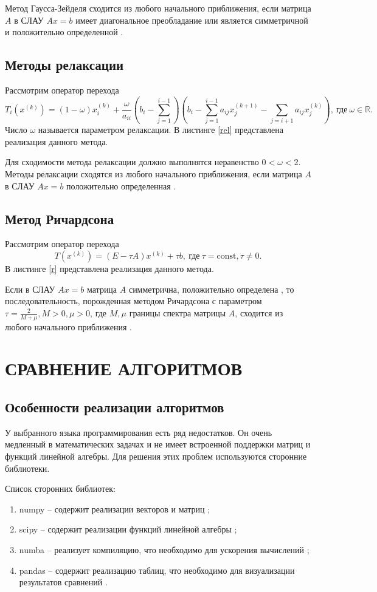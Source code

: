 \documentclass[14pt]{extarticle}
\begin{document}
     Метод Гаусса-Зейделя сходится из любого начального приближения, если матрица $A$ в СЛАУ
     $Ax= b$ имеет диагональное преобладание или является симметричной и положительно определенной \cite{book}.
      \subsection{Методы релаксации}
      Рассмотрим оператор перехода 
      \[
      T_{i}(x^{(k)}) = (1- \omega) x_{i}^{(k)} + \frac{\omega}{a_{ii}}
      (b_{i} - \sum_{j=1}^{i-1}) (b_{i} - \sum_{j=1}^{i-1} a_{ij} x_{j}^{(k+1)} -
      \sum_{j=i+1} a_{ij} x_{j}^{(k)}), ~
      \text{где}~ \omega \in \mathbb{R}
      .\] 
      Число $\omega$ называется параметром релаксации. В листинге \ref{rel} представлена реализация данного метода.
      
      Для сходимости метода релаксации должно выполнятся неравенство $0<\omega<2$.
      Методы релаксации сходятся из любого начального приближения, если матрица  $A$ в СЛАУ 
      $Ax=b$  положительно определенная \cite{book}. 
\subsection{Метод Ричардсона}
Рассмотрим оператор перехода
\[
    T(x^{(k)}) = (E - \tau A) x^{(k)} + \tau b, ~ \text{где} ~ \tau = \text{const}, \tau \neq 0
.\] 
В листинге \ref{r} представлена реализация данного метода.

Если в СЛАУ $Ax = b$ матрица  $A$ симметрична, положительно определена , то последовательность, порожденная методом Ричардсона с параметром
$\tau = \frac{2}{M + \mu}, M>0,\mu>0$, где $M,\mu$ границы спектра матрицы $A$, сходится из любого начального приближения \cite{book}.
\pagebreak
\section{СРАВНЕНИЕ АЛГОРИТМОВ}
\subsection{Особенности реализации алгоритмов}
У выбранного языка программирования есть ряд недостатков. Он очень медленный 
в математических задачах и не имеет встроенной поддержки матриц и функций линейной алгебры.
Для решения этих проблем используются сторонние библиотеки.

Список сторонних библиотек:
\begin{enumerate}
    \item numpy --  содержит реализации векторов и матриц \cite{numpy};
    \item scipy --  содержит реализации функций линейной алгебры \cite{scipy};
    \item numba -- реализует компиляцию, что необходимо для ускорения вычислений \cite{numba};
    \item pandas -- содержит реализацию таблиц, что необходимо для визуализации результатов сравнений \cite{pandas}.
\end{enumerate}
\end{document}
